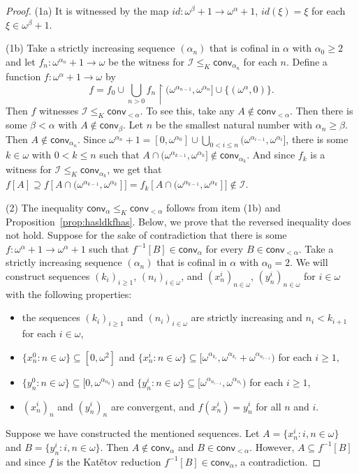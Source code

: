 \documentclass{amsart}
\theoremstyle{plain}
\theoremstyle{definition}
\theoremstyle{remark}
\newcommand{\cI}{\mathcal{I}}
\newcommand{\I}{\cI}
\newcommand{\conv}{\mathsf{conv}}
\renewcommand{\subset}{\subseteq}
\begin{document}
\begin{proof}
    (1a) It is witnessed by the map $id:\omega^{\beta}+1\to\omega^\alpha+1$, $id(\xi)=\xi$ for each $\xi\in\omega^\beta+1$. 

    (1b) Take a strictly increasing sequence $(\alpha_n)$ that is cofinal in $\alpha$ with $\alpha_0\geq 2$ and let $f_n :\omega^{\alpha_n}+1\to\omega$ be the witness for $\I\leq_K \conv_{\alpha_n}$ for each $n$. Define a function $f:\omega^\alpha+1\to\omega$ by $$f=f_0\cup \bigcup_{n>0} f_n \restriction (\omega^{\alpha_{n-1}}, \omega^{\alpha_n}]\cup \{(\omega^\alpha,0)\}.$$ Then $f$ witnesses $\I\leq_K\conv_{<\alpha}$. To see this, take any $A\notin\conv_{<\alpha}$. Then there is some $\beta<\alpha$ with   $A\notin\conv_{\beta}$. Let $n$ be the smallest natural number with $\alpha_n\geq\beta$. Then $A\notin\conv_{\alpha_n}$. Since  $\omega^{\alpha_n}+1=[0,\omega^{\alpha_0}]\cup\bigcup_{0<i\leq n}(\omega^{\alpha_{i-1}}, \omega^{\alpha_i}]$, there is some $k\in \omega $ with  $0<k\leq n$ such that $A\cap(\omega^{\alpha_{k-1}}, \omega^{\alpha_k}] \notin \conv_{\alpha_k} $. And since $f_k$ is a witness for $\I\leq_K \conv_{\alpha_k}$, we get that $f[A] \supseteq f[A\cap(\omega^{\alpha_{k-1}}, \omega^{\alpha_k}]]=f_k[A\cap(\omega^{\alpha_{k-1}}, \omega^{\alpha_k}]]\notin\I$.

    (2) 
     The inequality $\conv_\alpha\leq_K\conv_{<\alpha}$ follows from item (1b) and Proposition~\ref{prop:hasldkfhas}.
    Below, we prove that the reversed inequality does not hold.
    Suppose for the sake of contradiction that there is some $f : \omega ^\alpha + 1 \to \omega ^\alpha + 1$ such that $f^{-1}[B]\in \conv_\alpha$ for every $B\in\conv_{<\alpha}$. Take a strictly increasing sequence $(\alpha_n)$ that is cofinal in $\alpha$ with $\alpha_0=2$. 
    We will construct sequences $(k_i)_{i\geq 1}$, $(n_i)_{i\in\omega}$, and $(x^i_n)_{n\in\omega}$, $(y^i_n)_{n\in\omega}$ for $i\in\omega$ with the following properties:
    \begin{itemize}
        \item the sequences $(k_i)_{i\geq 1}$ and $(n_i)_{i\in\omega}$ are strictly increasing and $n_i<k_{i+1}$ for each $i\in\omega$,
        \item $\{x^0_n:n\in\omega\}\subset [0,\omega^2]$ and $\{x^i_n:n\in\omega\}\subset [\omega^{\alpha_{k_i}},\omega^{\alpha_{k_i}} + \omega^{\alpha_{n_{i-1}}})$ for each $i\geq 1$,
         \item $\{y^0_n:n\in\omega\}\subset [0,\omega^{\alpha_{n_0}})$ and $\{y^i_n:n\in\omega\}\subset [\omega^{\alpha_{n_{i-1}}},\omega^{\alpha_{n_i}})$ for each $i\geq 1$, \item $(x^i_n)_n$ and $(y^i_n)_n$ are convergent, and $f(x^i_n)=y^i_n$ for all $n$ and $i$.
    \end{itemize}
Suppose we have constructed the mentioned sequences. Let $A=\{x^i_n : i,n\in\omega\}$ and $B=\{y^i_n : i,n\in\omega\}$. Then $A\notin \conv_\alpha$ and $B\in\conv_{<\alpha}$. However, $A\subset f^{-1}[B]$ and since $f$ is the Kat\v{e}tov reduction $f^{-1}[B]\in\conv_\alpha$, a contradiction.


\end{proof}
\end{document}
